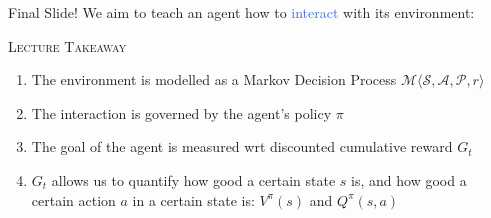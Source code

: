 \documentclass{beamer}
\newenvironment{takeaway}[1]{%
	\definecolor{shadecolor}{gray}{0.9}%
		\begin{shaded}{\color{skymagenta}\noindent\textsc{#1}}\\%
		}{%
		\end{shaded}%
}
\begin{document}


\begin{frame}{Final Slide!}
	We aim to teach an agent how to \textcolor{RoyalBlue}{interact} with its environment:
	\begin{takeaway}{Lecture Takeaway}
		\begin{enumerate}
			\item The environment is modelled as a Markov Decision Process $\mathcal{M}\langle \mathcal{S}, \mathcal{A}, \mathcal{P}, r \rangle$
			\item The interaction is governed by the agent's policy $\pi$
			\item The goal of the agent is measured wrt discounted cumulative reward $G_t$
			\item $G_t$ allows us to quantify how good a certain state $s$ is, and how good a certain action $a$ in a certain state is: $V^\pi(s)$ and $Q^\pi(s,a)$ 
		\end{enumerate}
	\end{takeaway}
\end{frame}
\end{document}
